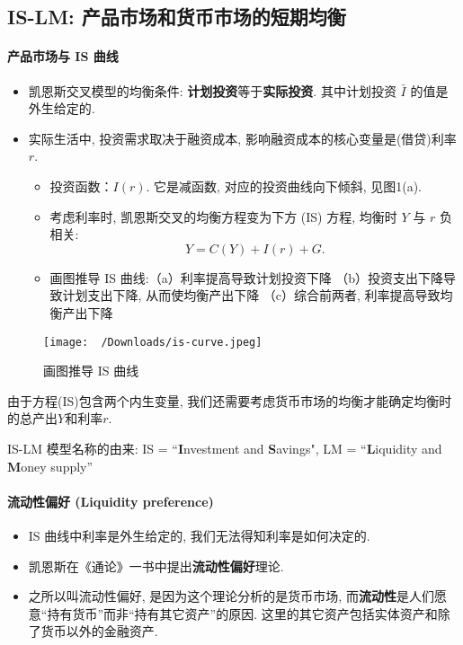 \documentclass[11pt]{ctexart}
\author{}
\date{}
\begin{document}
\begin{center}
  \subsection*{IS-LM: 产品市场和货币市场的短期均衡}
\end{center}

\paragraph{产品市场与 IS 曲线}
\begin{itemize}
\item
  凯恩斯交叉模型的均衡条件: \textbf{计划投资}等于\textbf{实际投资}. 其中计划投资 $\bar{I}$ 的值是外生给定的.
\item
  实际生活中,  投资需求取决于融资成本,  影响融资成本的核心变量是(借贷)利率 $r$.

  \begin{itemize}
  \item
    投资函数：$I(r)$. 它是减函数, 对应的投资曲线向下倾斜,  见图1(a).
  \item 
    考虑利率时,  凯恩斯交叉的均衡方程变为下方 (IS) 方程,  均衡时 $Y$ 与 $r$ 负相关:
    \begin{equation*}
      Y = C(Y) + I(r) + G. 
      \tag{IS}  
    \end{equation*}
 
  \item
    画图推导 IS 曲线:（a）利率提高导致计划投资下降
    （b）投资支出下降导致计划支出下降, 从而使均衡产出下降
    （c）综合前两者, 利率提高导致均衡产出下降
  \end{itemize}
\end{itemize}

\begin{figure}[htbp]
\centering
\texttt{[image: ~/Downloads/is-curve.jpeg]}
\caption{画图推导 IS 曲线}
\label{fig:is}
\end{figure}

由于方程(IS)包含两个内生变量,  我们还需要考虑货币市场的均衡才能确定均衡时的总产出$Y$和利率$r$.

IS-LM 模型名称的由来: IS = ``\textbf{I}nvestment and \textbf{S}avings",  LM = ``\textbf{L}iquidity and \textbf{M}oney supply''

\paragraph{流动性偏好 (Liquidity preference)}
\begin{itemize}
\item
  IS 曲线中利率是外生给定的,  我们无法得知利率是如何决定的.
\item
  凯恩斯在《通论》一书中提出\textbf{流动性偏好}理论.
\item
  之所以叫流动性偏好, 是因为这个理论分析的是货币市场, 而\textbf{流动性}是人们愿意``持有货币''而非``持有其它资产''的原因. 这里的其它资产包括实体资产和除了货币以外的金融资产.
\end{itemize}
\end{document}
